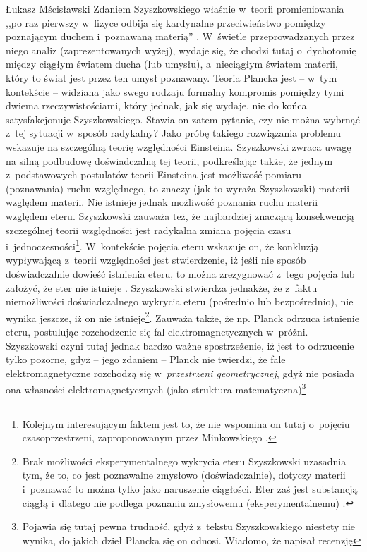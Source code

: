 \begin{artplenv}{Łukasz Mścisławski}
Zdaniem Szyszkowskiego właśnie w~teorii promieniowania ,,po raz pierwszy w~fizyce odbija się kardynalne przeciwieństwo pomiędzy poznającym duchem i~poznawaną materią''
\parencite[][s.~54]{szyszkowski_o_1916}. %
 W~świetle przeprowadzanych przez niego analiz (zaprezentowanych wyżej), wydaje się, że chodzi tutaj o~dychotomię między ciągłym światem ducha (lub umysłu), a~nieciągłym światem materii, który to świat jest przez ten umysł poznawany. Teoria Plancka jest -- w~tym kontekście -- widziana jako swego rodzaju formalny kompromis pomiędzy tymi dwiema rzeczywistościami, który jednak, jak się wydaje, nie do końca satysfakcjonuje Szyszkowskiego. Stawia on zatem pytanie, czy nie można wybrnąć z~tej sytuacji w~sposób radykalny? Jako próbę takiego rozwiązania problemu wskazuje na szczególną teorię względności Einsteina. Szyszkowski zwraca uwagę na silną podbudowę doświadczalną tej teorii, podkreślając także, że jednym z~podstawowych postulatów teorii Einsteina jest możliwość pomiaru (poznawania) ruchu względnego, to znaczy (jak to wyraża Szyszkowski) materii względem materii. Nie istnieje jednak możliwość poznania ruchu materii względem eteru. Szyszkowski zauważa też, że najbardziej znaczącą konsekwencją szczególnej teorii względności jest radykalna zmiana pojęcia czasu i~jednoczesności\footnote{Kolejnym interesującym faktem jest to, że nie wspomina on tutaj o~pojęciu czasoprzestrzeni, zaproponowanym przez Minkowskiego 
\parencite*[][]{minkowski_raum_1909}.%
}. W~kontekście pojęcia eteru wskazuje on, że konkluzją wypływającą z~teorii względności jest stwierdzenie, iż jeśli nie sposób doświadczalnie dowieść istnienia eteru, to można zrezygnować z~tego pojęcia lub założyć, że eter nie istnieje 
\parencite[por.][s.~54–55]{szyszkowski_o_1916}. %
 Szyszkowski stwierdza jednakże, że z~faktu niemożliwości doświadczalnego wykrycia eteru (pośrednio lub bezpośrednio), nie wynika jeszcze, iż on nie istnieje\footnote{Brak możliwości eksperymentalnego wykrycia eteru Szyszkowski uzasadnia tym, że to, co jest poznawalne zmysłowo (doświadczalnie), dotyczy materii i~poznawać to można tylko jako naruszenie ciągłości. Eter zaś jest substancją ciągłą i~dlatego nie podlega poznaniu zmysłowemu (eksperymentalnemu) 
\parencite[][s.~55]{szyszkowski_o_1916}.%
 }. Zauważa także, że np. Planck odrzuca istnienie eteru, postulując rozchodzenie się fal elektromagnetycznych w~próżni. Szyszkowski czyni tutaj jednak bardzo ważne spostrzeżenie, iż jest to odrzucenie tylko pozorne, gdyż -- jego zdaniem -- Planck nie twierdzi, że fale elektromagnetyczne rozchodzą się w~\textit{przestrzeni geometrycznej}, gdyż nie posiada ona własności elektromagnetycznych (jako struktura matematyczna)\footnote{Pojawia się tutaj pewna trudność, gdyż z~tekstu Szyszkowskiego niestety nie wynika, do jakich dzieł Plancka się on odnosi. Wiadomo, że napisał recenzję 
}
\end{artplenv}
